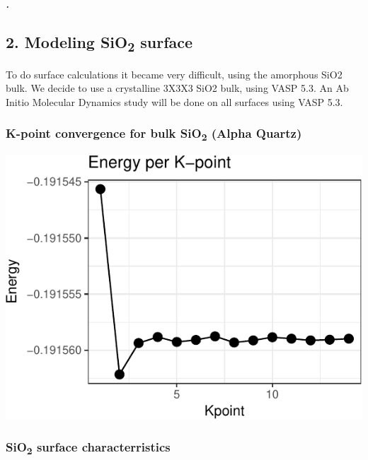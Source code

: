 \documentclass[]{article}
\let\oldsubparagraph\subparagraph
\renewcommand{\subparagraph}[1]{\oldsubparagraph{#1}\mbox{}}
\begin{document}
\hypertarget{section-3}{%
\subparagraph{.}\label{section-3}}

\hypertarget{modeling-sio2-surface}{%
\subsection{\texorpdfstring{2. Modeling SiO\textsubscript{2}
surface}{2. Modeling SiO2 surface}}\label{modeling-sio2-surface}}

To do surface calculations it became very difficult, using the amorphous
SiO2 bulk. We decide to use a crystalline 3X3X3 SiO2 bulk, using VASP
5.3. An Ab Initio Molecular Dynamics study will be done on all surfaces
using VASP 5.3.

\hypertarget{k-point-convergence-for-bulk-sio2-alpha-quartz}{%
\subsubsection{\texorpdfstring{K-point convergence for bulk
SiO\textsubscript{2} (Alpha
Quartz)}{K-point convergence for bulk SiO2 (Alpha Quartz)}}\label{k-point-convergence-for-bulk-sio2-alpha-quartz}}

\includegraphics{merge_files/figure-latex/Graph:K-point convergence-1.pdf}

\hypertarget{sio2-surface-characterristics}{%
\subsubsection{\texorpdfstring{SiO\textsubscript{2} surface
characterristics}{SiO2 surface characterristics}}\label{sio2-surface-characterristics}}
\end{document}
